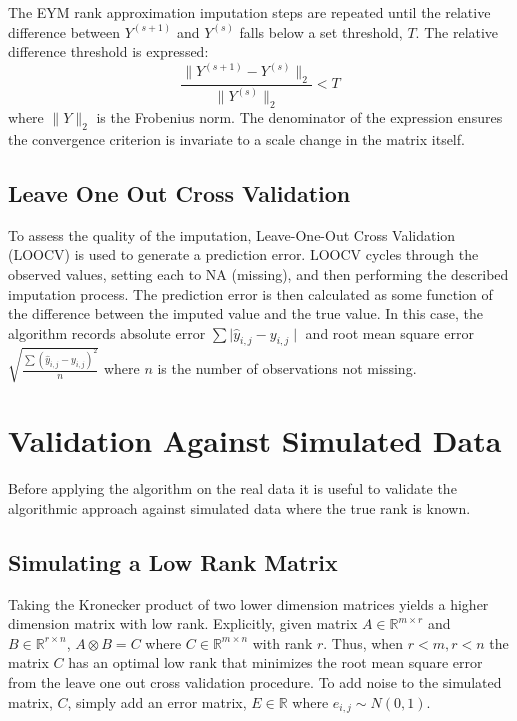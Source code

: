 \documentclass[12pt,twoside]{dukestatscithesis}
\theoremstyle{definition}
\theoremstyle{definition}
\theoremstyle{definition}
\theoremstyle{remark}
\begin{document}
The EYM rank approximation imputation steps are repeated until the
relative difference between \(Y^{(s+1)}\) and \(Y^{(s)}\) falls below a
set threshold, \(T\). The relative difference threshold is expressed:
\[\frac{\|Y^{(s+1)}-Y^{(s)}\|_2}{\|Y^{(s)}\|_2} < T\] where \(\|Y\|_2\)
is the Frobenius norm. The denominator of the expression ensures the
convergence criterion is invariate to a scale change in the matrix
itself.

\subsection{Leave One Out Cross
Validation}\label{leave-one-out-cross-validation}

To assess the quality of the imputation, Leave-One-Out Cross Validation
(LOOCV) is used to generate a prediction error. LOOCV cycles through the
observed values, setting each to NA (missing), and then performing the
described imputation process. The prediction error is then calculated as
some function of the difference between the imputed value and the true
value. In this case, the algorithm records absolute error
\(\sum \mid \hat y_{i,j} - y_{i,j}\mid\) and root mean square error
\(\sqrt{\frac{\sum (\hat y_{i,j} - y_{i,j})^2}{n}}\) where \(n\) is the
number of observations not missing.

\section{Validation Against Simulated
Data}\label{validation-against-simulated-data}

Before applying the algorithm on the real data it is useful to validate
the algorithmic approach against simulated data where the true rank is
known.

\subsection{Simulating a Low Rank
Matrix}\label{simulating-a-low-rank-matrix}

Taking the Kronecker product of two lower dimension matrices yields a
higher dimension matrix with low rank. Explicitly, given matrix
\(A \in \mathbb{R}^{m \times r}\) and \(B \in \mathbb{R}^{r \times n}\),
\(A \otimes B = C\) where \(C \in \mathbb{R}^{m \times n}\) with rank
\(r\). Thus, when \(r < m, r < n\) the matrix \(C\) has an optimal low
rank that minimizes the root mean square error from the leave one out
cross validation procedure. To add noise to the simulated matrix, \(C\),
simply add an error matrix, \(E \in \mathbb{R}\) where
\(e_{i,j} \sim N(0,1)\).
\end{document}
